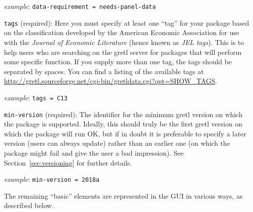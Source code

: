 \documentclass[oneside]{book}
\newcommand{\ttusage}[1]{\textit{example}: \quad \texttt{#1}}
\begin{document}
\begin{description}
  \ttusage{data-requirement = needs-panel-data}

\item \texttt{tags} (required): Here you must specify at least one
  ``tag'' for your package based on the classification developed by
  the American Economic Association for use with the \textit{Journal
    of Economic Literature} (hence known as \textit{JEL tags}). This
  is to help users who are searching on the gretl server for packages
  that will perform some specific function. If you supply more than
  one tag, the tags should be separated by spaces. You can find a
  listing of the available tags at
  \url{http://gretl.sourceforge.net/cgi-bin/gretldata.cgi?opt=SHOW_TAGS}.

  \ttusage{tags = C13}

\item \texttt{min-version} (required): The identifier for the minimum
  gretl version on which the package is supported.  Ideally, this
  should truly be the first gretl version on which the package will
  run OK, but if in doubt it is preferable to specify a later version
  (users can always update) rather than an earlier one (on which the
  package might fail and give the user a bad impression). See
  Section~\ref{sec:versioning} for further details.

   \ttusage{min-version = 2018a}

\end{description}

The remaining ``basic'' elements are represented in the GUI
in various ways, as described below.
\end{document}
